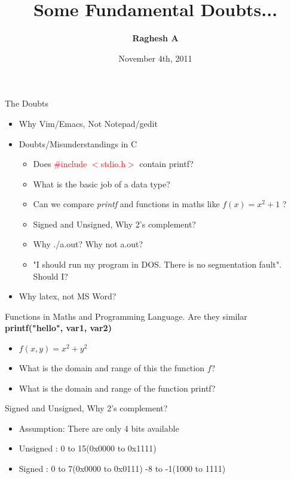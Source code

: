 \documentclass[14pt]{beamer}
\title{Some Fundamental Doubts...}
\author{\textbf{Raghesh A}}
\date{November 4th, 2011}
\begin{document}
\begin{frame}
\titlepage
\end{frame}

\begin{frame}{The Doubts}
\begin{itemize}
\item Why Vim/Emacs, Not Notepad/gedit
\pause
\item Doubts/Misunderstandings in C
\pause
  \begin{itemize}
    \item Does \textcolor{red}{\#include $<$stdio.h$>$} contain printf?
\pause
    \item What is the basic job of a data type?
\pause
    \item Can we compare \emph{printf} and functions in maths like $f(x) = x^2 + 1$ ?
\pause
    \item Signed and Unsigned, Why 2's complement?
\pause
    \item Why ./a.out? Why not a.out?
\pause
    \item "I should run my program in DOS. There is no segmentation fault". Should I?
  \end{itemize}
\pause
\item Why latex, not MS Word?
\end{itemize}
\end{frame}

\begin{frame}{Functions in Maths and Programming Language. Are they similar}
        \textbf{printf("hello", var1, var2)}
\begin{itemize}
\item $f(x,y) = x^2 + y^2$
\pause
\item What is the domain and range of this the function $f$?
\item What is the domain and range of the function printf?
\pause
\end{itemize}
\end{frame}

\begin{frame}{Signed and Unsigned, Why 2's complement?}
\begin{itemize}
\item Assumption: There are only 4 bits available
\pause
\item Unsigned : 0 to 15(0x0000 to 0x1111)
\item Signed : 0 to 7(0x0000 to 0x0111) -8 to -1(1000 to 1111)
\pause
\end{itemize}
\end{frame}
\end{document}
